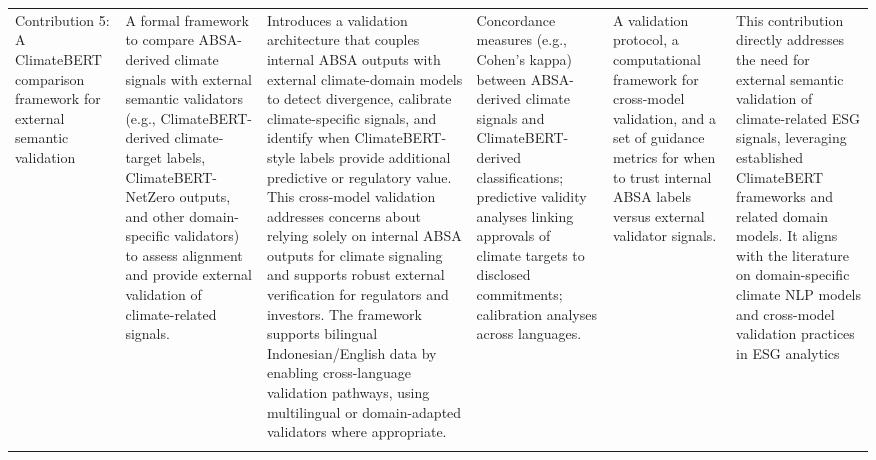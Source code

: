 \begin{landscape}
\begin{longtable}{p{2cm} p{3cm} p{6cm} p{3cm} p{3cm} p{6cm}}
Contribution 5: A ClimateBERT comparison framework for external semantic validation & A formal framework to compare ABSA-derived climate signals with external semantic validators (e.g., ClimateBERT-derived climate-target labels, ClimateBERT-NetZero outputs, and other domain-specific validators) to assess alignment and provide external validation of climate-related signals. & Introduces a validation architecture that couples internal ABSA outputs with external climate-domain models to detect divergence, calibrate climate-specific signals, and identify when ClimateBERT-style labels provide additional predictive or regulatory value. This cross-model validation addresses concerns about relying solely on internal ABSA outputs for climate signaling and supports robust external verification for regulators and investors. The framework supports bilingual Indonesian/English data by enabling cross-language validation pathways, using multilingual or domain-adapted validators where appropriate. & Concordance measures (e.g., Cohen’s kappa) between ABSA-derived climate signals and ClimateBERT-derived classifications; predictive validity analyses linking approvals of climate targets to disclosed commitments; calibration analyses across languages. & A validation protocol, a computational framework for cross-model validation, and a set of guidance metrics for when to trust internal ABSA labels versus external validator signals. & This contribution directly addresses the need for external semantic validation of climate-related ESG signals, leveraging established ClimateBERT frameworks and related domain models. It aligns with the literature on domain-specific climate NLP models and cross-model validation practices in ESG analytics \cite{10.21203/rs.3.rs-3600821/v1,10.48550/arxiv.2510.01222,10.18653/v1/2023.emnlp-main.975,10.1609/aaai.v38i16.29726,10.1108/dta-01-2024-0065,10.30519/ahtr.1436175,10.2139/ssrn.4308287} \\
\addlinespace

\end{longtable}
\end{landscape}
